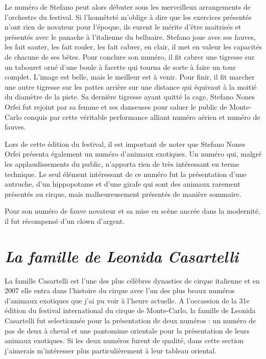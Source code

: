 Le numéro de Stefano peut alors débuter sous les merveilleux arrangements de l’orchestre du festival. Si l’honnêteté m’oblige à dire que les exercices présentés n’ont rien de novateur pour l’époque, ils eurent le mérite d’être maitrisés et présentés avec le panache à l’italienne du belluaire. Stefano joue avec ses fauves, les fait sauter, les fait rouler, les fait cabrer, en clair, il met en valeur les capacités de chacune de ses bêtes. Pour conclure son numéro, il fit cabrer une tigresse sur un tabouret orné d'une boule à facette qui tourna de sorte à faire un tour complet. L’image est belle, mais le meilleur est à venir. Pour finir, il fit marcher une autre tigresse sur les pattes arrière sur une distance qui équivaut à la moitié du diamètre de la piste. Sa dernière tigresse ayant quitté la cage, Stefano Nones Orfei fut rejoint par sa femme et ses danseuses pour saluer le public de Monte-Carlo conquis par cette véritable performance alliant numéro aérien et numéro de fauves.

Lors de cette édition du festival, il est important de noter que Stefano Nones Orfei présenta également un numéro d’animaux exotiques. Un numéro qui, malgré les applaudissements du public, n’apporta rien de très intéressant en terme technique. Le seul élément intéressant de ce numéro fut la présentation d’une autruche, d’un hippopotame et d’une girafe qui sont des animaux rarement présentés au cirque, mais malheureusement présentés de manière sommaire.

Pour son numéro de fauve novateur et sa mise en scène ancrée dans la modernité, il fut récompensé d’un clown d’argent.

\section*{\textit{La famille de Leonida Casartelli}}
{}

La famille Casartelli est l’une des plus célèbres dynasties de cirque italienne et en 2007 elle entra dans l’histoire du cirque avec l’un des plus beaux numéros d’animaux exotiques que j’ai pu voir à l’heure actuelle. A l’occassion de la 31e édition du festival international du cirque de Monte-Carlo, la famille de Leonida Casartelli fut selectionnée pour la présentation de deux numéros : un numéro de pas de deux à cheval et une pantomime orientale pour la présentation de leurs animaux exotiques. Si les deux numéros furent de qualité, dans cette section j’aimerais m’intéresser plus particulièrement à leur tableau oriental.

